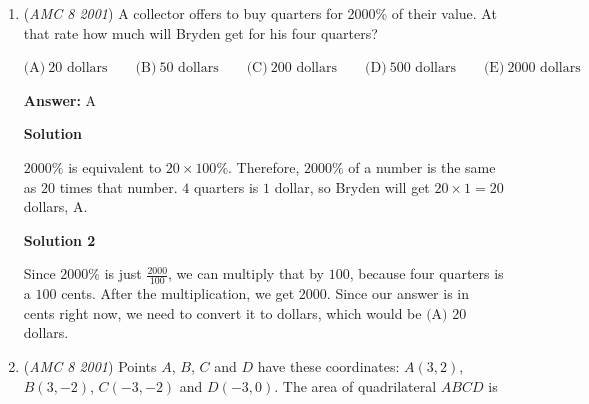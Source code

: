 \begin{enumerate}
 The large kite is covered with gold foil. The foil is cut from a rectangular piece that just covers the entire grid. How many square inches of waste material are cut off from the four corners?


 $\text{(A)}\ 63 \qquad \text{(B)}\ 72 \qquad \text{(C)}\ 180 \qquad \text{(D)}\ 189 \qquad \text{(E)}\ 264$

 \textbf{Answer: }D



\textbf{Solution}

The large grid has dimensions three times that of the small grid, so its dimensions are $3(6)\times3(7)$, or $18\times21$, so the area is $(18)(21)=378$. The area of the kite is half of the area of the rectangle as you can see, so the area of the waste material is also half the area of the rectangle.  Thus, the area of the waste material is $378/2=\boxed{189\textbf{ (D)}}$.

 


	\item (\textit{AMC 8 2001}) A collector offers to buy quarters for 2000\% of their value. At that rate how much will Bryden get for his four quarters?


 $\text{(A)}\ 20\text{ dollars} \qquad \text{(B)}\ 50\text{ dollars} \qquad \text{(C)}\ 200\text{ dollars} \qquad \text{(D)}\ 500\text{ dollars} \qquad \text{(E)}\ 2000\text{ dollars}$

 \textbf{Answer: }A



\textbf{Solution}

$2000\%$ is equivalent to $20\times100\%$. Therefore, $2000\%$ of a number is the same as $20$ times that number. $4$ quarters is $1$ dollar, so Bryden will get $20\times1={20}$ dollars, $\boxed{\text{A}}$.

 



\textbf{Solution 2}

Since $2000\%$ is just $\frac{2000}{100}$, we can multiply that by $100$, because four quarters is a $100$ cents. After the multiplication, we get $2000$. Since our answer is in cents right now, we need to convert it to dollars, which would be $\boxed{\text{(A) 20}}$ dollars.

 


	\item (\textit{AMC 8 2001}) Points $A$, $B$, $C$ and $D$ have these coordinates: $A(3,2)$, $B(3,-2)$, $C(-3,-2)$ and $D(-3, 0)$. The area of quadrilateral $ABCD$ is



\end{enumerate}
